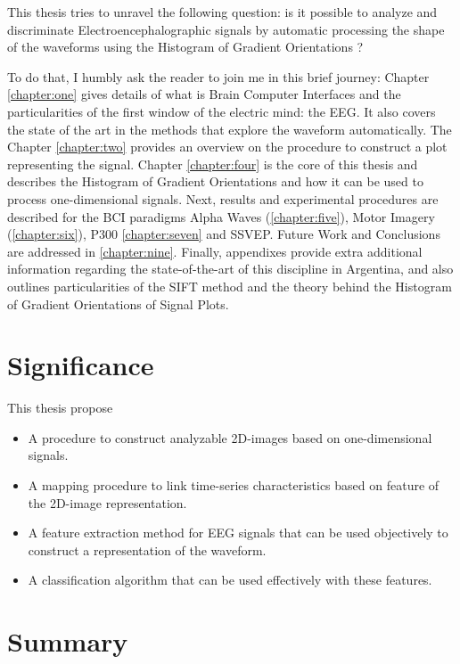 This thesis tries to unravel the following question:  is it possible to analyze and discriminate Electroencephalographic signals by automatic processing the shape of the waveforms using the Histogram of Gradient Orientations ?

To do that, I humbly ask the reader to join me in this brief journey:  Chapter \ref{chapter:one} gives details of what is Brain Computer Interfaces and the particularities of the first window of the electric mind: the EEG. It also covers the state of the art in the methods that explore the waveform automatically.  The Chapter \ref{chapter:two} provides an overview on the procedure to construct a plot representing the signal. Chapter \ref{chapter:four} is the core of this thesis and describes the Histogram of Gradient Orientations and how it can be used to process one-dimensional signals.
Next, results and experimental procedures are described for the BCI paradigms  Alpha Waves (\ref{chapter:five}), Motor Imagery (\ref{chapter:six}), P300 \ref{chapter:seven} and SSVEP.  Future Work and Conclusions are addressed in \ref{chapter:nine}.  Finally, appendixes provide extra additional information regarding the state-of-the-art of this discipline in Argentina, and also outlines particularities of the SIFT method and the theory behind the Histogram of Gradient Orientations of Signal Plots.

\section{Significance}

This thesis propose

\begin{itemize}
\item A procedure to construct analyzable 2D-images based on one-dimensional signals.
\item A mapping procedure to link time-series characteristics based on feature of the 2D-image representation.
\item A feature extraction method for EEG signals that can be used objectively to construct a representation of the waveform.
\item A classification algorithm that can be used effectively with these features.
\end{itemize}

\section{Summary}

